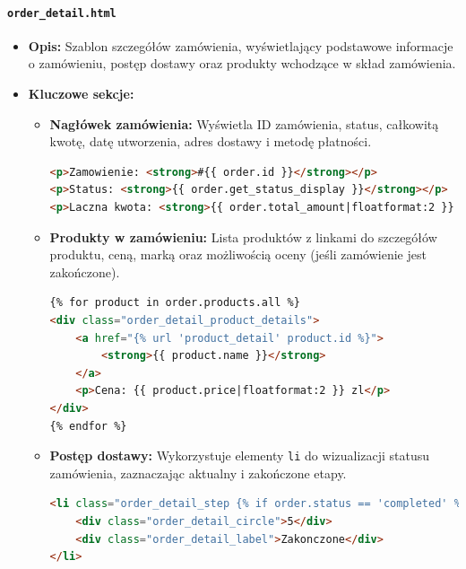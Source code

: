 \documentclass[12pt,a4paper,oneside]{article}
\theoremstyle{definition}
\numberwithin{equation}{section}
\begin{document}
\paragraph{\texttt{order\_detail.html}}
\begin{itemize}
    \item \textbf{Opis:} 
    Szablon szczegółów zamówienia, wyświetlający podstawowe informacje o zamówieniu, postęp dostawy oraz produkty wchodzące w skład zamówienia.  
    \item \textbf{Kluczowe sekcje:}
    \begin{itemize}
        \item \textbf{Nagłówek zamówienia:} 
        Wyświetla ID zamówienia, status, całkowitą kwotę, datę utworzenia, adres dostawy i metodę płatności.
        \begin{lstlisting}[language=HTML]
<p>Zamowienie: <strong>#{{ order.id }}</strong></p>
<p>Status: <strong>{{ order.get_status_display }}</strong></p>
<p>Laczna kwota: <strong>{{ order.total_amount|floatformat:2 }} zl</strong></p>
        \end{lstlisting}
        \item \textbf{Produkty w zamówieniu:} 
        Lista produktów z linkami do szczegółów produktu, ceną, marką oraz możliwością oceny (jeśli zamówienie jest zakończone).
        \begin{lstlisting}[language=HTML]
{% for product in order.products.all %}
<div class="order_detail_product_details">
    <a href="{% url 'product_detail' product.id %}">
        <strong>{{ product.name }}</strong>
    </a>
    <p>Cena: {{ product.price|floatformat:2 }} zl</p>
</div>
{% endfor %}
        \end{lstlisting}
        \item \textbf{Postęp dostawy:}
        Wykorzystuje elementy \texttt{li} do wizualizacji statusu zamówienia, zaznaczając aktualny i zakończone etapy.
        \begin{lstlisting}[language=HTML]
<li class="order_detail_step {% if order.status == 'completed' %}completed{% endif %}">
    <div class="order_detail_circle">5</div>
    <div class="order_detail_label">Zakonczone</div>
</li>
        \end{lstlisting}
    \end{itemize}
\end{itemize}
\end{document}
